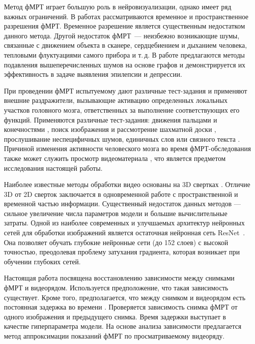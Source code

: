 \documentclass[a4paper, 12pt]{extarticle}
\begin{document}
Метод фМРТ играет большую роль в нейровизуализации, однако имеет ряд важных ограничений.
В работах \citep{menon1999spatial, logothetis2008we} рассматриваются
временное и пространственное разрешения фМРТ. Временное разрешение является существенным
недостатком данного метода. Другой недостаток фМРТ~--- неизбежно возникающие шумы,
связанные с движением объекта в сканере, сердцебиением и дыханием человека, тепловыми
флуктуациями самого прибора и т.\,д. В работе \citep{1804.10167} предлагаются методы
подавления вышеперечисленных шумов на основе графов и демонстрируется их эффективность в задаче
выявления эпилепсии и депрессии.

При проведении фМРТ испытуемому дают различные тест-задания и
применяют внешние раздражители, вызывающие активацию определенных
локальных участков головного мозга, ответственных за выполнение
соответствующих его функций.
Применяются различные тест-задания: движения пальцами и конечностями
\citep{Roux1998, Papke1999}, поиск изображения и рассмотрение
шахматной доски \citep{Engel1994, Schneider1994},
прослушивание неспецифичных шумов, единичных слов
или связного текста \citep{Binder1994, Dymarkowski1998}.
Причиной изменения активности человеского мозга во время фМРТ-обследования
также может служить просмотр видеоматериала \citep{decety1997brain},
что является предметом исследования настоящей работы. 

Наиболее известные методы обработки видео основаны на 3D свертках \citep{tran2015learning}.
Отличие 3D от 2D сверток заключается в одновременной работе с пространственной и временной частью
информации. Существенный недостаток данных методов — сильное увеличение числа параметров модели и
большие вычислительные затраты. Одной из наиболее современных и улучшаемых архитектур
нейронных сетей для обработки изображений является остаточная нейронная сеть ResNet~\citep{he2015deep}.
Она позволяет обучать глубокие нейронные сети (до 152 слоев) с высокой точностью,
преодолевая проблему затухания градиента, которая возникает при обучении глубоких сетей.

Настоящая работа посвящена восстановлению зависимости между снимками фМРТ и видеорядом.
Используется предположение, что такая зависимость существует.
Кроме того, предполагается, что между снимком и видеорядом есть постоянная задержка во времени
\citep{Logothetis2003}.
Проверяется зависимость снимка фМРТ от одного изображения и предыдущего снимка.
Время задержки выступает в качестве гиперпараметра модели.
На основе анализа зависимости предлагается метод аппроксимации показаний фМРТ по
просматриваемому видеоряду.
\end{document}
